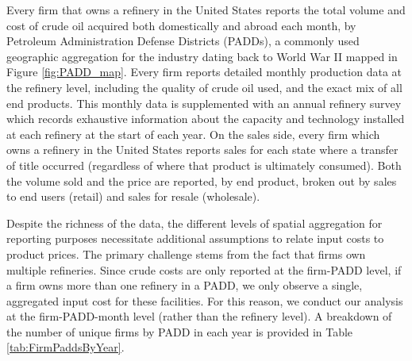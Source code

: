 \documentclass[12pt]{article}
\begin{document}
Every firm that owns a refinery in the United States reports the total volume and cost of crude oil acquired both domestically and abroad each month, by Petroleum Administration Defense Districts (PADDs), a commonly used geographic aggregation for the industry dating back to World War II mapped in Figure \ref{fig:PADD_map}. Every firm reports detailed monthly production data at the refinery level, including the quality of crude oil used, and the exact mix of all end products. This monthly data is supplemented with an annual refinery survey which records exhaustive information about the capacity and technology installed at each refinery at the start of each year. On the sales side, every firm which owns a refinery in the United States reports sales for each state where a transfer of title occurred (regardless of where that product is ultimately consumed). Both the volume sold and the price are reported, by end product, broken out by sales to end users (retail) and sales for resale (wholesale).

Despite the richness of the data, the different levels of spatial aggregation for reporting purposes necessitate additional assumptions to relate input costs to product prices. The primary challenge stems from the fact that firms own multiple refineries. Since crude costs are only reported at the firm-PADD level, if a firm owns more than one refinery in a PADD, we only observe a single, aggregated input cost for these facilities. For this reason, we conduct our analysis at the firm-PADD-month level (rather than the refinery level). A breakdown of the number of unique firms by PADD in each year is provided in Table \ref{tab:FirmPaddsByYear}.
\end{document}
